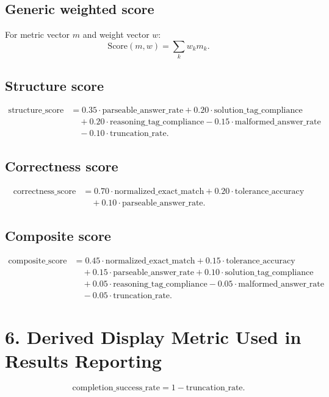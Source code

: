 \documentclass[11pt]{article}
\begin{document}
\subsection*{Generic weighted score}
For metric vector $m$ and weight vector $w$:
\[
\mathrm{Score}(m,w) = \sum_k w_k m_k.
\]

\subsection*{Structure score}
\[
\begin{aligned}
\mathrm{structure\_score}
&=
0.35 \cdot \mathrm{parseable\_answer\_rate}
+ 0.20 \cdot \mathrm{solution\_tag\_compliance} \\
&\quad
+ 0.20 \cdot \mathrm{reasoning\_tag\_compliance}
- 0.15 \cdot \mathrm{malformed\_answer\_rate} \\
&\quad
- 0.10 \cdot \mathrm{truncation\_rate}.
\end{aligned}
\]

\subsection*{Correctness score}
\[
\begin{aligned}
\mathrm{correctness\_score}
&=
0.70 \cdot \mathrm{normalized\_exact\_match}
+ 0.20 \cdot \mathrm{tolerance\_accuracy} \\
&\quad
+ 0.10 \cdot \mathrm{parseable\_answer\_rate}.
\end{aligned}
\]

\subsection*{Composite score}
\[
\begin{aligned}
\mathrm{composite\_score}
&=
0.45 \cdot \mathrm{normalized\_exact\_match}
+ 0.15 \cdot \mathrm{tolerance\_accuracy} \\
&\quad
+ 0.15 \cdot \mathrm{parseable\_answer\_rate}
+ 0.10 \cdot \mathrm{solution\_tag\_compliance} \\
&\quad
+ 0.05 \cdot \mathrm{reasoning\_tag\_compliance}
- 0.05 \cdot \mathrm{malformed\_answer\_rate} \\
&\quad
- 0.05 \cdot \mathrm{truncation\_rate}.
\end{aligned}
\]

\section*{6. Derived Display Metric Used in Results Reporting}
\[
\mathrm{completion\_success\_rate}
=
1 - \mathrm{truncation\_rate}.
\]
\end{document}
